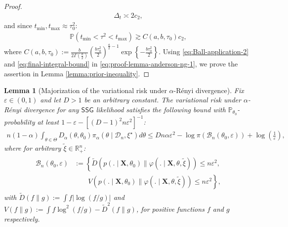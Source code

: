 \documentclass[12pt]{article}
\newtheorem{lemma}{Lemma}[section]
\numberwithin{equation}{section}
\begin{document}
\begin{proof}
\begin{align}
    \Delta_t \asymp 2c_2,
\end{align}
and since $t_{\min}, t_{\max} \approx \tau_0^2$:
\begin{align}\label{eq:final-integral-bound}
    \mathbb{P}(t_{\min} < \tau^2 < t_{\max}) \gtrsim C(a, b, \tau_0)c_2,
\end{align}
where $C(a, b, \tau_0):= \frac{b}{2\Gamma\left(\frac{a}{2}\right)}\left(\frac{b \tau_0^2}{2}\right)^{\frac{a}{2}-1}\exp\left\{-\frac{b\tau_0^2}{2}\right\}$.
%
Using \eqref{eq:Ball-application-2} and \eqref{eq:final-integral-bound} in \eqref{eq:proof-lemma-anderson-ng-1}, we prove the assertion in Lemma \ref{lemma:prior-inequality}.
\end{proof}

\begin{lemma}[Majorization of the variational risk under $\alpha$-R\'{e}nyi divergence]\label{lemma:majorization-Renyi}
Fix $\varepsilon \in (0, 1)$ and let $D>1$ be an arbitrary constant. The variational risk under $\alpha$-R\'{e}nyi divergence for any $\mathsf{SSG}$ likelihood satisfies the following bound with $\mathbb{P}_{\theta_0}$-probability at least $1-\varepsilon - [(D-1)^2n\varepsilon^2]^{-1}$:
\begin{align}\label{eq:lemma-majorization-renyi-1}
        n(1-\alpha)\int_{\theta\in \Theta}D_{\alpha}(\theta, \theta_{0})\pi_{\alpha}(\theta \mid \mathcal{D}_n, \xi^{\star})d\theta
        \leq Dn\alpha\varepsilon^2 - \log \pi(\mathcal{B}_n(\theta_0, \varepsilon)) + \log\left(\frac{1}{\varepsilon}\right),
\end{align}
where for arbitrary $\tilde{\xi} \in \mathbb{R}_{+}^{n}$:
\begin{align}\label{eq:lemma-majorization-renyi-2}
    \begin{split}
        \mathcal{B}_{n}(\theta_0, \varepsilon) &:= \left\{\tilde{D}\left(p(.\mid \mathbf{X}, \theta_{0}) \parallel \varphi(.\mid \mathbf{X}, \theta, \tilde{\xi})\right)\leq n\varepsilon^2,
        \right.\\&\left.\qquad 
        {V}\left(p(.\mid \mathbf{X}, \theta_0) \parallel \varphi(.\mid \mathbf{X}, \theta, \tilde{\xi})\right)\leq n\varepsilon^2\right\},
    \end{split}
\end{align}
with $\tilde{D}(f\parallel g) := \int f|\log(f/g)|$ and ${V}(f\parallel g) := \int f\log^{2}(f/g) - \tilde{D}^{2}(f\parallel g)$, for positive functions $f$ and $g$ respectively.
\end{lemma}
\end{document}

